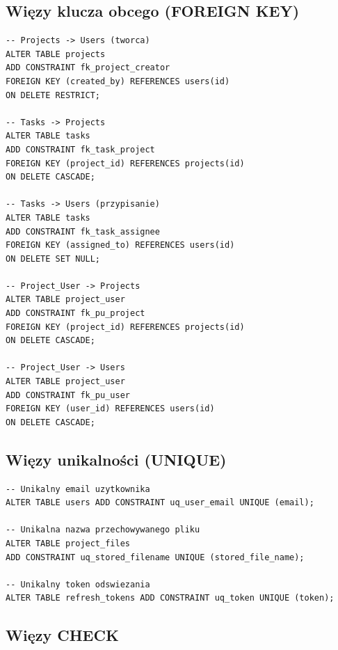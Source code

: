 \documentclass[12pt,a4paper]{report}
\begin{document}
\subsection{Więzy klucza obcego (FOREIGN KEY)}

\begin{lstlisting}[style=sqlstyle, caption={Definicje kluczy obcych}]
-- Projects -> Users (tworca)
ALTER TABLE projects 
ADD CONSTRAINT fk_project_creator 
FOREIGN KEY (created_by) REFERENCES users(id)
ON DELETE RESTRICT;

-- Tasks -> Projects
ALTER TABLE tasks 
ADD CONSTRAINT fk_task_project 
FOREIGN KEY (project_id) REFERENCES projects(id)
ON DELETE CASCADE;

-- Tasks -> Users (przypisanie)
ALTER TABLE tasks 
ADD CONSTRAINT fk_task_assignee 
FOREIGN KEY (assigned_to) REFERENCES users(id)
ON DELETE SET NULL;

-- Project_User -> Projects
ALTER TABLE project_user 
ADD CONSTRAINT fk_pu_project 
FOREIGN KEY (project_id) REFERENCES projects(id)
ON DELETE CASCADE;

-- Project_User -> Users
ALTER TABLE project_user 
ADD CONSTRAINT fk_pu_user 
FOREIGN KEY (user_id) REFERENCES users(id)
ON DELETE CASCADE;
\end{lstlisting}

\subsection{Więzy unikalności (UNIQUE)}

\begin{lstlisting}[style=sqlstyle, caption={Więzy UNIQUE}]
-- Unikalny email uzytkownika
ALTER TABLE users ADD CONSTRAINT uq_user_email UNIQUE (email);

-- Unikalna nazwa przechowywanego pliku
ALTER TABLE project_files 
ADD CONSTRAINT uq_stored_filename UNIQUE (stored_file_name);

-- Unikalny token odswiezania
ALTER TABLE refresh_tokens ADD CONSTRAINT uq_token UNIQUE (token);
\end{lstlisting}

\subsection{Więzy CHECK}
\end{document}
